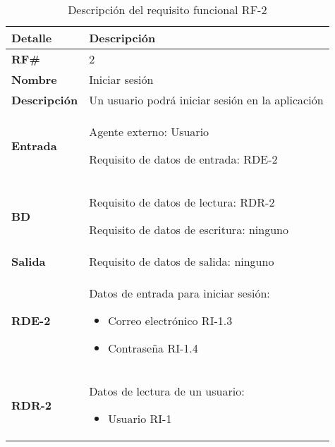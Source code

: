 \begin{table}[H]
    \centering
    \begin{tabular}{|p{4cm}|p{7cm}|}
        \hline
        \rowcolor{lightgray}
        \textbf{Detalle} & \textbf{Descripción} \\
        \hline
        \textbf{RF\#} & 2 \\
        \hline
        \textbf{Nombre} & Iniciar sesión \\
        \hline
        \textbf{Descripción} & Un usuario podrá iniciar sesión en la aplicación \\
        \hline
        \textbf{Entrada} &
        Agente externo: Usuario
        
        Requisito de datos de entrada: RDE-2 \\
        \hline
        \textbf{BD} &
        Requisito de datos de lectura: RDR-2
        
        Requisito de datos de escritura: ninguno \\
        \hline
        \textbf{Salida} & Requisito de datos de salida: ninguno \\
        \hline
        \textbf{RDE-2} & Datos de entrada para iniciar sesión:
            \begin{itemize}
                \item Correo electrónico RI-1.3
                \item Contraseña RI-1.4
            \end{itemize} \\
        \hline
        \textbf{RDR-2} & Datos de lectura de un usuario:
            \begin{itemize}
                \item Usuario RI-1
            \end{itemize} \\
        \hline
    \end{tabular}
    \caption{Descripción del requisito funcional RF-2}
    \label{tab:rf-2}
\end{table}

